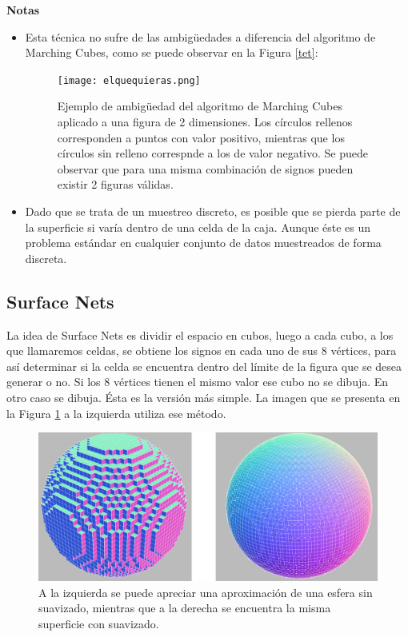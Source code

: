 \documentclass[12pt]{article}
\begin{document}
\textbf{Notas}
\begin{itemize}
\item Esta técnica no sufre de las ambigüedades a diferencia del algoritmo de Marching Cubes, como se puede observar en la Figura \ref{tet}:
\begin{figure}[h!]
\texttt{[image: elquequieras.png]}
\caption{Ejemplo de ambigüedad del algoritmo de Marching Cubes aplicado a una figura de 2 dimensiones. Los círculos rellenos corresponden a puntos con valor positivo, mientras que los círculos sin relleno correspnde a los de valor negativo. Se puede observar que para una misma combinación de signos pueden existir 2 figuras válidas.}
\end{figure}
\item Dado que se trata de un muestreo discreto, es posible que se pierda parte de la superficie si varía dentro de una celda de la caja. Aunque éste es un problema estándar en cualquier conjunto de datos muestreados de forma discreta.
\end{itemize}

\subsection{Surface Nets}
\noindent La idea de Surface Nets es dividir el espacio en cubos, luego a cada cubo, a los que llamaremos celdas, se obtiene los signos en cada uno de sus 8 vértices, para así determinar si la celda se encuentra dentro del límite de la figura que se desea generar o no. Si los 8 vértices tienen el mismo valor ese cubo no se dibuja. En otro caso se dibuja. Ésta es la versión más simple. La imagen que se presenta en la Figura \ref{minecraft} a la izquierda utiliza ese método.
\begin{figure}[h]
\includegraphics[width =\linewidth,center]{snc.png}
\caption{ A la izquierda se puede apreciar una aproximación de una esfera sin suavizado, mientras que a la derecha se encuentra la misma superficie con suavizado.}
\label{minecraft}
\end{figure}
\end{document}
